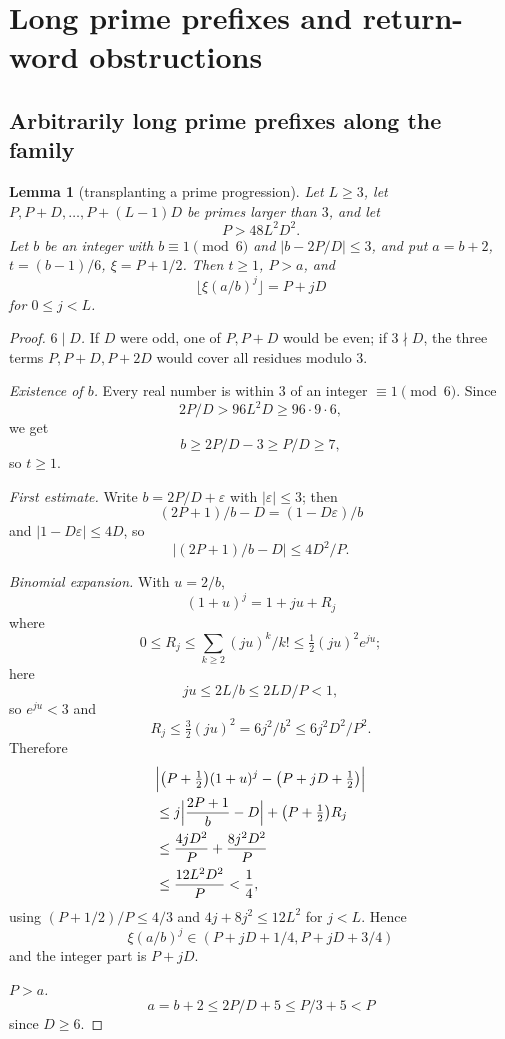 \documentclass[11pt,reqno]{amsart}
\newtheorem{lemma}[theorem]{Lemma}
\theoremstyle{definition}
\theoremstyle{remark}
\begin{document}
\section{Long prime prefixes and return-word obstructions}\label{app:E}

\subsection{Arbitrarily long prime prefixes along the family}\label{sec:E.1}

\begin{samepage}
\begin{lemma}[transplanting a prime progression]\leavevmode\label{thm:67}
Let \(L\ge3\), let
\(P,P+D,\ldots,P+(L-1)D\) be primes larger than \(3\), and let
\[
P>48L^2D^2.
\]
Let \(b\) be an integer with \(b\equiv1\pmod6\) and
\(|b-2P/D|\le3\), and put \(a=b+2\), \(t=(b-1)/6\), \(\xi=P+1/2\). Then
\(t\ge1\), \(P>a\), and
\[
\lfloor\xi(a/b)^j\rfloor=P+jD
\]
for
\(0\le j<L\).
\label{thm-end:67}
\end{lemma}
\end{samepage}

\begin{proof}\leavevmode\label{proof:67}
\emph{\(6\mid D\).} If \(D\) were odd, one of \(P,P+D\) would be
even; if \(3\nmid D\), the three terms \(P,P+D,P+2D\) would cover all
residues modulo \(3\).

\emph{Existence of \(b\).} Every real number is
within \(3\) of an integer \(\equiv1\pmod6\). Since
\[
2P/D>96L^2D\ge96\cdot9\cdot6,
\]
we get
\[
b\ge2P/D-3\ge P/D\ge7,
\]
so
\(t\ge1\).

\emph{First estimate.} Write \(b=2P/D+\varepsilon\) with
\(|\varepsilon|\le3\); then
\[
(2P+1)/b-D=(1-D\varepsilon)/b
\]
and \(|1-D\varepsilon|\le4D\), so
\[
|(2P+1)/b-D|\le4D^2/P.
\]

\emph{Binomial expansion.} With \(u=2/b\),
\[
(1+u)^j=1+ju+R_j
\]
where
\[
0\le R_j\le\sum_{k\ge2}(ju)^k/k!\le\tfrac12(ju)^2e^{ju};
\]
here
\[
ju\le2L/b\le2LD/P<1,
\]
so \(e^{ju}<3\) and
\[
R_j\le\tfrac32(ju)^2=6j^2/b^2\le6j^2D^2/P^2.
\]
Therefore
\[
\begin{aligned}
&\Bigl|\bigl(P+\tfrac12\bigr)(1+u)^j-\bigl(P+jD+\tfrac12\bigr)\Bigr|\\
&\le j\Bigl|\frac{2P+1}{b}-D\Bigr|+\bigl(P+\tfrac12\bigr)R_j\\
&\le\frac{4jD^2}{P}+\frac{8j^2D^2}{P}\\
&\le\frac{12L^2D^2}{P}<\frac14,
\end{aligned}
\]
using \((P+1/2)/P\le4/3\) and \(4j+8j^2\le12L^2\) for \(j<L\). Hence
\[
\xi(a/b)^j\in(P+jD+1/4,P+jD+3/4)
\]
and the integer part is \(P+jD\).

\emph{\(P>a\).}
\[
a=b+2\le2P/D+5\le P/3+5<P
\]
since \(D\ge6\). \qedhere
\end{proof}
\end{document}
